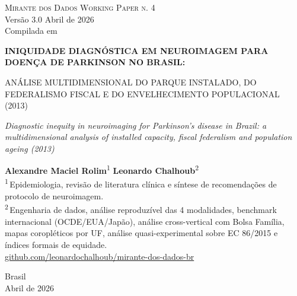 \documentclass[12pt,a4paper,oneside]{article}
\begin{document}
\begin{titlepage}
  \begin{center}
    \vspace*{1.5cm}
    {\small\textsc{Mirante dos Dados \quad\textbar\quad Working Paper n. 4}}\\
    {\small Versão 3.0 \textemdash{} Abril de 2026}\\[2pt]
    {\footnotesize Compilada em \COMPILESTAMP\ \textbullet\ \texttt{\COMPILESHA}}

    \vfill

    {\LARGE\bfseries
     INIQUIDADE DIAGNÓSTICA EM NEUROIMAGEM
     PARA DOENÇA DE PARKINSON NO BRASIL:

     ANÁLISE MULTIDIMENSIONAL DO PARQUE
     INSTALADO, DO FEDERALISMO FISCAL E DO
     ENVELHECIMENTO POPULACIONAL
     (2013)}

    \vspace{1cm}
    {\large\itshape
     Diagnostic inequity in neuroimaging for Parkinson's disease in
     Brazil: a multidimensional analysis of installed capacity, fiscal
     federalism and population ageing (2013)}

    \vfill

    {\large\textbf{Alexandre Maciel Rolim}\textsuperscript{1} \quad\textbullet\quad
     \textbf{Leonardo Chalhoub}\textsuperscript{2}}\\[6pt]
    {\small\textsuperscript{1}\,Epidemiologia, revisão de literatura
     clínica e síntese de recomendações de protocolo de neuroimagem.}\\[2pt]
    {\small\textsuperscript{2}\,Engenharia de dados, análise
     reproduzível das 4 modalidades, benchmark internacional
     (OCDE/EUA/Japão), análise cross-vertical com Bolsa Família,
     mapas coropléticos por UF, análise quasi-experimental sobre
     EC 86/2015 e índices formais de equidade.}\\[6pt]
    {\small\href{https://github.com/leonardochalhoub/mirante-dos-dados-br}{github.com/leonardochalhoub/mirante-dos-dados-br}}

    \vfill

    {\small Brasil \\ Abril de 2026}
  \end{center}
\end{titlepage}

\end{document}
